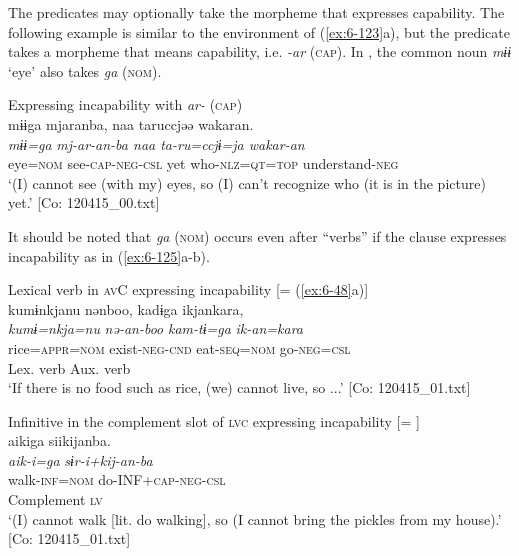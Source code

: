 \begin{styleBeschriftung}
The predicates may optionally take the morpheme that expresses capability. The following example is similar to the environment of (\ref{ex:6-123}a), but the predicate takes a morpheme that means capability, i.e. \textit{-ar} (\textsc{cap}). In , the common noun \textit{mɨɨ} ‘eye’ also takes \textit{ga} (\textsc{nom}).

\ea\label{ex:6-124}
 Expressing incapability with \textit{ar-} (\textsc{cap})\\

{\TM}
\glll mɨɨga  mjaranba,  naa  taruccjəə  wakaran.\\
\textit{mɨɨ=ga}  \textit{mj-ar-an-ba  naa  ta-ru=ccjɨ=ja  wakar-an}\\
    eye=\textsc{nom}  see-\textsc{cap}-\textsc{neg}-\textsc{csl}  yet  who-\textsc{nlz}=\textsc{qt}=\textsc{top}  understand-\textsc{neg}\\
\glt    ‘(I) cannot see (with my) eyes, so (I) can’t recognize who (it is in the picture) yet.’ [Co: 120415\_00.txt]
\z

It should be noted that \textit{ga} (\textsc{nom}) occurs even after “verbs” if the clause expresses incapability as in (\ref{ex:6-125}a-b).

\ea\label{ex:6-125}
 \ea Lexical verb in \textsc{av}C expressing incapability [= (\ref{ex:6-48}a)]\\

 {\TM}
\glll kumɨnkjanu  nənboo,  kadɨga  ikjankara,\\
\textit{kumɨ=nkja=nu}  \textit{nə-an-boo}  \textit{kam-tɨ=ga}  \textit{ik-an=kara}\\
    rice=\textsc{appr}=\textsc{nom}  exist-\textsc{neg}-\textsc{cnd}  eat-\textsc{seq}=\textsc{nom}  go-\textsc{neg}=\textsc{csl}\\
        Lex. verb  Aux. verb\\
\glt    ‘If there is no food such as rice, (we) cannot live, so ...’ [Co: 120415\_01.txt]
\z

\ex Infinitive in the complement slot of \textsc{lvc} expressing incapability [= ]\\

{\TM}
\glll aikiga  siikijanba.\\
\textit{aik-i=ga}  \textit{sɨr-i+kij-an-ba}\\
    walk-\textsc{inf}=\textsc{nom}  do-INF+\textsc{cap}-\textsc{neg}-\textsc{csl}\\
    Complement  \textsc{lv}\\
\glt    ‘(I) cannot walk [lit. do walking], so (I cannot bring the pickles from my house).’  [Co: 120415\_01.txt]
\z


\end{styleBeschriftung}
